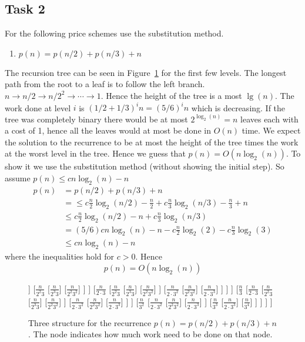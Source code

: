 \documentclass{report}
\begin{document}
\subsection*{Task 2}
For the following price schemes use the substitution method.
\begin{enumerate}
	\item $p(n) = p(n/2) + p(n/3) + n$
\end{enumerate}
The recursion tree can be seen in Figure~\ref{fig: task2} for the first few levels. The longest path from the root to a leaf is to follow the left branch. $n \rightarrow n/2 \rightarrow n/2^2 \rightarrow \cdots \rightarrow 1$. Hence the height of the tree is a most $\lg(n)$. The work done at level $i$ is $(1/2 + 1/3)^i n = (5/6)^i n$ which is decreasing. If the tree was completely binary there would be at most $2^{\log_2(n)} = n$ leaves each with a cost of 1, hence all the leaves would at most be done in $O(n)$ time. We expect the solution to the recurrence to be at most the height of the tree times the work at the worst level in the tree. Hence we guess that $p(n) = O(n\log_2(n))$. To show it we use the substitution method (without showing the initial step). So assume $p(n) \leq c n \log_2(n) - n$
\begin{align*}
p(n) &= p(n/2) + p(n/3) +n \\
		 &=\leq c\frac{n}{2}\log_2(n/2) - \frac{n}{2} + c\frac{n}{3}\log_2(n/3) -\frac{n}{3} +n\\
		 &\leq c\frac{n}{2}\log_2(n/2) - n + c\frac{n}{3}\log_2(n/3) \\
		 &= (5/6)cn\log_2(n) - n - c\frac{n}{2}\log_2(2) - c\frac{n}{3}\log_2(3)\\
		 &\leq cn\log_2(n) - n
\end{align*}
where the inequalities hold for $c>0$. Hence 
$$
p(n) = O(n\log_2(n))
$$


\begin{figure}[b]
\centering
\begin{forest}
[$n$
	[$\frac{n}{2}$
		[$\frac{n}{2^2}$
			[$\frac{n}{2^3}$
				[$\frac{n}{2^4}$]
				[$\frac{n}{2^3 3}$]
			]
			[$\frac{n}{2^2 3}$
				[$\frac{n}{2^3 3}$]
				[$\frac{n}{2^2 3^2}$]
			]
		]
		[$\frac{n}{2 \cdot 3}$
			[$\frac{n}{2^2 3}$
				[$\frac{n}{2^3 3}$]
				[$\frac{n}{2^2 3^2}$]
			]
			[$\frac{n}{2 \cdot 3^2}$
				[$\frac{n}{2^2 3^2}$]
				[$\frac{n}{2 \cdot 3^3}$]
			]
		]
	]
	[$\frac{n}{3}$
		[$\frac{n}{2 \cdot 3}$
			[$\frac{n}{2^2 3}$
				[$\frac{n}{2^3 3}$]
				[$\frac{n}{2^2 3^2}$]
			]
			[$\frac{n}{2 \cdot 3^2}$
				[$\frac{n}{2^2 3^2}$]
				[$\frac{n}{2 \cdot 3^3}$]
			]
		]
		[$\frac{n}{3^2}$
			[$\frac{n}{2 \cdot 3^2}$
				[$\frac{n}{2^2 3^2}$]
				[$\frac{n}{2 \cdot 3^3}$]
			]
			[$\frac{n}{3^3}$
				[$\frac{n}{2 \cdot 3^3}$]
				[$\frac{n}{3^4}$]
			]
		]
	]
]
\end{forest}
\caption{Three structure for the recurrence $p(n) = p(n/2) + p(n/3) + n$. The node indicates how much work need to be done on that node.}
\label{fig: task2}
\end{figure}
\end{document}

